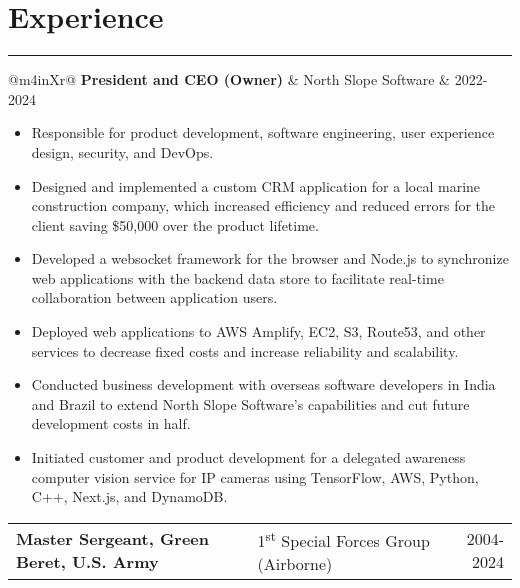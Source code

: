 \documentclass[letterpaper,11pt]{article}
\begin{document}
\section*{Experience}
\hrule
\begin{tabularx}{\linewidth}{@{}m{4in}Xr@{}}
  \textbf{President and CEO (Owner)} & North Slope Software & 2022-2024 \\
\end{tabularx}
\vspace{-1.5em}
\begin{itemize}[leftmargin=*,nosep]
  \item Responsible for product development, software engineering, user experience design, security, and DevOps.
  \item Designed and implemented a custom CRM application for a local marine construction company, which increased efficiency and reduced errors for the client saving \$50,000 over the product lifetime.
  \item Developed a websocket framework for the browser and Node.js to synchronize web applications with the backend data store to facilitate real-time collaboration between application users.
  \item Deployed web applications to AWS Amplify, EC2, S3, Route53, and other services to decrease fixed costs and increase reliability and scalability.
  \item Conducted business development with overseas software developers in India and Brazil to extend North Slope Software's capabilities and cut future development costs in half.
  \item Initiated customer and product development for a delegated awareness computer vision service for IP cameras using TensorFlow, AWS, Python, C++, Next.js, and DynamoDB.
\end{itemize}

\begin{tabularx}{\linewidth}{@{}m{4in}Xr@{}}
  \textbf{Master Sergeant, Green Beret, U.S. Army} & 1\textsuperscript{st} Special Forces Group (Airborne) & 2004-2024 \\
\end{tabularx}
\end{document}
